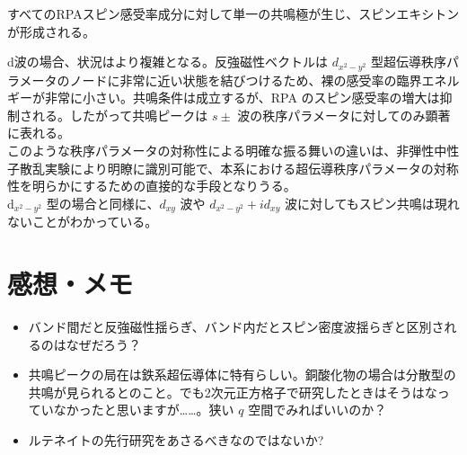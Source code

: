\documentclass[a4paper,12pt]{article}
\begin{document}
\begin{CJK}{UTF8}{min}
すべてのRPAスピン感受率成分に対して単一の共鳴極が生じ、スピンエキシトンが形成される。

d波の場合、状況はより複雑となる。反強磁性ベクトルは \( d_{x^2-y^2} \) 型超伝導秩序パラメータのノードに非常に近い状態を結びつけるため、裸の感受率の臨界エネルギーが非常に小さい。共鳴条件は成立するが、RPA のスピン感受率の増大は抑制される。したがって共鳴ピークは \( s\pm \) 波の秩序パラメータに対してのみ顕著に表れる。\\

このような秩序パラメータの対称性による明確な振る舞いの違いは、非弾性中性子散乱実験により明瞭に識別可能で、本系における超伝導秩序パラメータの対称性を明らかにするための直接的な手段となりうる。\\

d\(_{x^2-y^2}\) 型の場合と同様に、\( d_{xy} \) 波や \( d_{x^2-y^2}+id_{xy} \) 波に対してもスピン共鳴は現れないことがわかっている。

\section*{感想・メモ}
\begin{itemize}
    \item バンド間だと反強磁性揺らぎ、バンド内だとスピン密度波揺らぎと区別されるのはなぜだろう？
    \item 共鳴ピークの局在は鉄系超伝導体に特有らしい。銅酸化物の場合は分散型の共鳴が見られるとのこと。でも2次元正方格子で研究したときはそうはなっていなかったと思いますが……。狭い \( q \) 空間でみればいいのか？
    \item ルテネイトの先行研究をあさるべきなのではないか?
\end{itemize}

\end{CJK}
\end{document}
